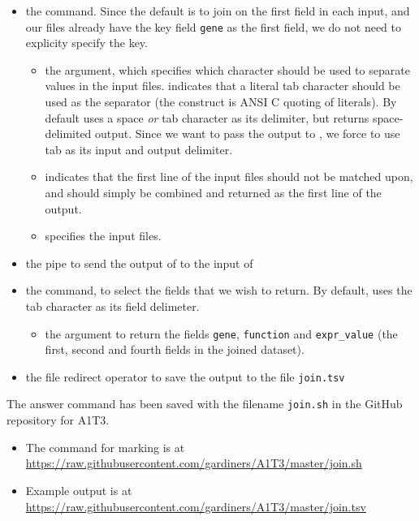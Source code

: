 \documentclass{article}
\begin{document}
\begin{itemize}
    \item the  command. Since the default is to join on the first field in each input, and our files already have the key field \texttt{gene} as the first field, we do not need to explicity specify the key.
    \begin{itemize}
        \item the  argument, which specifies which character should be used to separate values in the input files.  indicates that a literal tab character should be used as the separator (the  construct is ANSI C quoting of literals). By default  uses a space \textit{or} tab character as its delimiter, but returns space-delimited output. Since we want to pass the output to , we force  to use tab as its input and output delimiter.
        \item {} indicates that the first line of the input files should not be matched upon, and should simply be combined and returned as the first line of the output.
        \item {} specifies the input files.
    \end{itemize}
    \item the pipe \bashsnippet{|} to send the output of  to the input of 
    \item the  command, to select the fields that we wish to return. By default,  uses the tab character as its field delimeter.
    \begin{itemize}
        \item the  argument to return the fields \texttt{gene}, \texttt{function} and \texttt{expr\_value} (the first, second and fourth fields in the joined dataset).
    \end{itemize}
    \item the file redirect operator \bashsnippet{>} to save the output to the file \texttt{join.tsv}
\end{itemize}

The answer command has been saved with the filename \texttt{join.sh} in the GitHub repository for A1T3.
\begin{itemize}
    \item The command for marking is at \url{https://raw.githubusercontent.com/gardiners/A1T3/master/join.sh}
    \item Example output is at \url{https://raw.githubusercontent.com/gardiners/A1T3/master/join.tsv}
\end{itemize}
\end{document}
